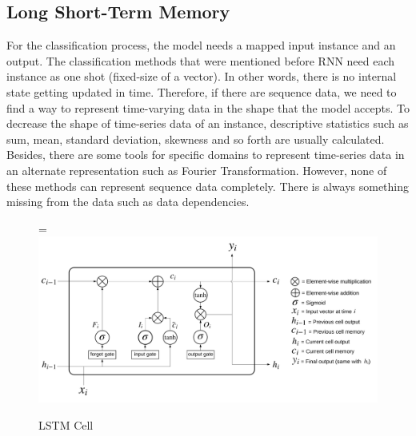 \documentclass[12pt,oneandhalf,chaparabic,lfm,phd,eng,oneside,pntc]{gsufbe}
\makeatletter
\let\old@includegraphics\includegraphics
\renewcommand{\includegraphics}[2][,]{%
  \setbox9=\hbox{\old@includegraphics[#1]{#2}}%
  \ifdim\wd9>\textwidth
    \old@includegraphics[#1,width=\textwidth]{#2}%
  \else
    \old@includegraphics[#1]{#2}%
  \fi%
}
\makeatother
\begin{document}
\subsection{Long Short-Term Memory}
\label{subsec:LSTM}
For the classification process, the model needs a mapped input instance and an output. The classification methods that were mentioned before RNN need each instance as one shot (fixed-size of a vector). In other words, there is no internal state getting updated in time. Therefore, if there are sequence data, we need to find a way to represent time-varying data in the shape that the model accepts. To decrease the shape of time-series data of an instance, descriptive statistics such as sum, mean, standard deviation, skewness and so forth are usually calculated. Besides, there are some tools for specific domains to represent time-series data in an alternate representation such as Fourier Transformation. However, none of these methods can represent sequence data completely. There is always something missing from the data such as data dependencies.

\begin{figure}[t]\vspace*{4pt}
\centerline{\includegraphics[width=160mm]{graphics/LSTM_Cell.png}}
\caption{LSTM Cell}
\label{fig:LSTM Cell}
\end{figure}
\end{document}
